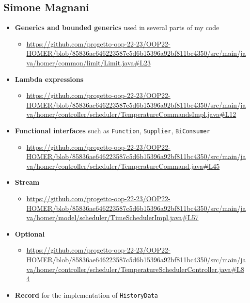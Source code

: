 \subsection{Simone Magnani}

\begin{itemize}
    \item \textbf{Generics and bounded generics} used in several parts of my code
    \begin{itemize}
        \item \url{https://github.com/progetto-oop-22-23/OOP22-HOMER/blob/85836ae646223587c5d6b15396a92bf811bc4350/src/main/java/homer/common/limit/Limit.java#L23}
    \end{itemize}
    \item \textbf{Lambda expressions}
    \begin{itemize}
        \item \url{https://github.com/progetto-oop-22-23/OOP22-HOMER/blob/85836ae646223587c5d6b15396a92bf811bc4350/src/main/java/homer/controller/scheduler/TemperatureCommandsImpl.java#L12}
    \end{itemize}
    \item \textbf{Functional interfaces} such as \texttt{Function}, \texttt{Supplier}, \texttt{BiConsumer}
    \begin{itemize}
        \item \url{https://github.com/progetto-oop-22-23/OOP22-HOMER/blob/85836ae646223587c5d6b15396a92bf811bc4350/src/main/java/homer/controller/scheduler/TemperatureCommand.java#L45}
    \end{itemize}
    \item \textbf{Stream}
    \begin{itemize}
        \item \url{https://github.com/progetto-oop-22-23/OOP22-HOMER/blob/85836ae646223587c5d6b15396a92bf811bc4350/src/main/java/homer/model/scheduler/TimeSchedulerImpl.java#L57}
    \end{itemize}
    \item \textbf{Optional}
    \begin{itemize}
        \item \url{https://github.com/progetto-oop-22-23/OOP22-HOMER/blob/85836ae646223587c5d6b15396a92bf811bc4350/src/main/java/homer/controller/scheduler/TemperatureSchedulerController.java#L84}
    \end{itemize}
    \item \textbf{Record} for the implementation of \texttt{HistoryData}
    \begin{itemize}

\end{itemize}
\end{itemize}
